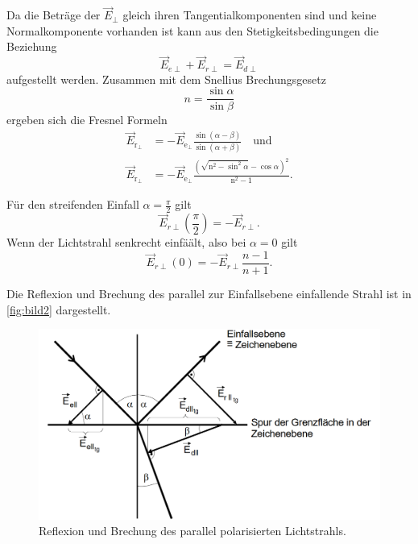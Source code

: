 Da die Beträge der $\vec{E}_{\perp}$ gleich ihren Tangentialkomponenten sind und keine Normalkomponente vorhanden ist kann aus den
Stetigkeitsbedingungen die Beziehung 
\begin{equation*}
    \vec{E}_{e\perp} + \vec{E}_{r \perp} = \vec{E}_{d\perp}
\end{equation*}
aufgestellt werden.  
Zusammen mit dem Snellius Brechungsgesetz
\begin{equation}
    n = \frac{\sin \alpha}{\sin \beta}
    \label{eqn:snellius}
\end{equation}
ergeben sich die Fresnel Formeln
\begin{equation}
    \begin{aligned}
    \vec{E}_{\mathrm{r}_{\perp}}&=-\vec{E}_{\mathrm{e}_{\perp}} \frac{\sin (\alpha-\beta)}{\sin (\alpha+\beta)} \quad \text{und}\\
    \vec{E}_{\mathrm{r}_{\perp}}&=-\vec{E}_{\mathrm{e}_{\perp}} \frac{\left(\sqrt{\mathrm{n}^2-\sin ^2 \alpha}-\cos \alpha\right)^2}{\mathrm{n}^2-1} .
    \label{eqn:fresnel1}
    \end{aligned}
\end{equation}

Für den streifenden Einfall $\alpha = \frac{\pi}{2}$ gilt
\begin{equation*}
    \vec{E}_{r\perp}(\frac{\pi}{2}) = - \vec{E}_{r\perp}.
\end{equation*}
Wenn der Lichtstrahl senkrecht einfäält, also bei $\alpha = 0$ gilt
\begin{equation*}
    \vec{E}_{r\perp}(0) = - \vec{E}_{r\perp}\frac{n - 1}{n + 1}.
\end{equation*}


Die Reflexion und Brechung des parallel zur Einfallsebene einfallende Strahl ist in \autoref{fig:bild2} dargestellt.

\begin{figure}[H]
	\centering
	\includegraphics[width=0.8\linewidth]{content/grafik/bild2.png}
	\caption{Reflexion und Brechung des parallel polarisierten Lichtstrahls. \cite{fresnel}}
	\label{fig:bild2}
\end{figure}

